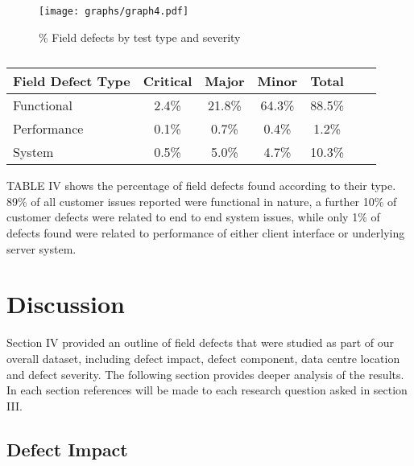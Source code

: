 \documentclass[conference]{IEEEtran}
\begin{document}
\begin{figure}
\begin{center}
\texttt{[image: graphs/graph4.pdf]} 
\caption{\% Field defects by test type and severity}
\end{center}
\label{fig:defecttesttype}
\end{figure}

\begin {table}
\caption {}
\begin{center}
\begin{tabular}{l*{5}{c}r} Field Defect Type & Critical & Major & Minor &  Total \\ \hline Functional & 2.4\%	 & 21.8\%	& 64.3\%	& 88.5\% \\ Performance & 0.1\% & 0.7\% & 0.4\% & 1.2\% \\ System & 0.5\% & 5.0\% & 4.7\% & 10.3\%   \end{tabular}
\end{center}
\end{table}


TABLE IV shows the percentage of field defects found according to their type. 89\% of all customer issues reported were functional in nature, a further 10\% of customer defects were related to end to end system issues, while only 1\% of defects found were related to performance of either client interface or underlying server system. 

\section{Discussion}

Section IV provided an outline of field defects that were studied as part of our overall dataset, including defect impact, defect component, data centre location and defect severity. The following section provides deeper analysis of the results. In each section references will be made to each research question asked in section III.

\subsection{Defect Impact}
\end{document}
